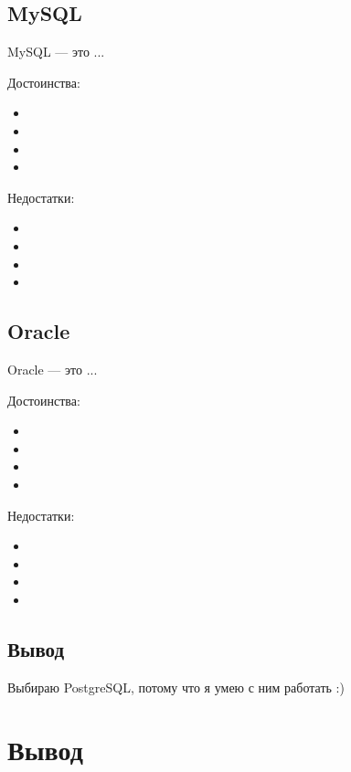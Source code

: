 \subsection{MySQL}

MySQL --- это ... 

Достоинства:
\begin{itemize}
    \item
    \item
    \item
    \item
\end{itemize}

Недостатки:
\begin{itemize}
    \item
    \item
    \item
    \item
\end{itemize}

\subsection{Oracle}

Oracle --- это ... 

Достоинства:
\begin{itemize}
    \item
    \item
    \item
    \item
\end{itemize}

Недостатки:
\begin{itemize}
    \item
    \item
    \item
    \item
\end{itemize}

\subsection*{Вывод}

Выбираю PostgreSQL, потому что я умею с ним работать :)

\section*{Вывод}
